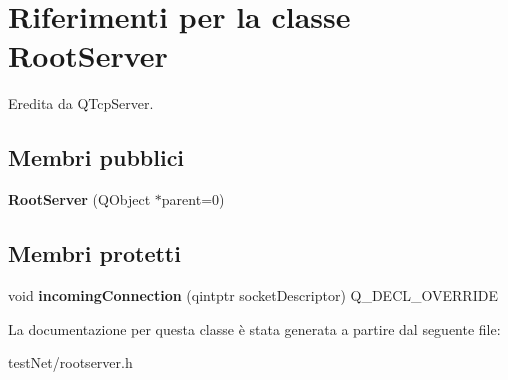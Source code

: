 \hypertarget{class_root_server}{\section{Riferimenti per la classe Root\-Server}
\label{class_root_server}
}


Eredita da Q\-Tcp\-Server.

\subsection*{Membri pubblici}
\begin{DoxyCompactItemize}
\item 
\hypertarget{class_root_server_a767bfac5c6cd83158c222c7804d99856}{{\bfseries Root\-Server} (Q\-Object $\ast$parent=0)}\label{class_root_server_a767bfac5c6cd83158c222c7804d99856}

\end{DoxyCompactItemize}
\subsection*{Membri protetti}
\begin{DoxyCompactItemize}
\item 
\hypertarget{class_root_server_a5a7531987f33679d44d2f8509593659c}{void {\bfseries incoming\-Connection} (qintptr socket\-Descriptor) Q\-\_\-\-D\-E\-C\-L\-\_\-\-O\-V\-E\-R\-R\-I\-D\-E}\label{class_root_server_a5a7531987f33679d44d2f8509593659c}

\end{DoxyCompactItemize}


La documentazione per questa classe è stata generata a partire dal seguente file\-:\begin{DoxyCompactItemize}
\item 
test\-Net/rootserver.\-h\end{DoxyCompactItemize}
